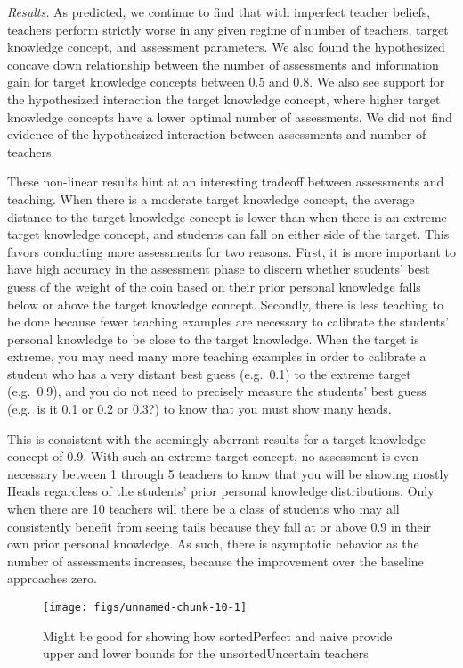 \documentclass[10pt, letterpaper]{article}
\newenvironment{CodeChunk}{}{}
\begin{document}
\emph{Results. } As predicted, we continue to find that with imperfect
teacher beliefs, teachers perform strictly worse in any given regime of
number of teachers, target knowledge concept, and assessment parameters.
We also found the hypothesized concave down relationship between the
number of assessments and information gain for target knowledge concepts
between 0.5 and 0.8. We also see support for the hypothesized
interaction the target knowledge concept, where higher target knowledge
concepts have a lower optimal number of assessments. We did not find
evidence of the hypothesized interaction between assessments and number
of teachers.

These non-linear results hint at an interesting tradeoff between
assessments and teaching. When there is a moderate target knowledge
concept, the average distance to the target knowledge concept is lower
than when there is an extreme target knowledge concept, and students can
fall on either side of the target. This favors conducting more
assessments for two reasons. First, it is more important to have high
accuracy in the assessment phase to discern whether students' best guess
of the weight of the coin based on their prior personal knowledge falls
below or above the target knowledge concept. Secondly, there is less
teaching to be done because fewer teaching examples are necessary to
calibrate the students' personal knowledge to be close to the target
knowledge. When the target is extreme, you may need many more teaching
examples in order to calibrate a student who has a very distant best
guess (e.g.~0.1) to the extreme target (e.g.~0.9), and you do not need
to precisely measure the students' best guess (e.g.~is it 0.1 or 0.2 or
0.3?) to know that you must show many heads.

This is consistent with the seemingly aberrant results for a target
knowledge concept of 0.9. With such an extreme target concept, no
assessment is even necessary between 1 through 5 teachers to know that
you will be showing mostly Heads regardless of the students' prior
personal knowledge distributions. Only when there are 10 teachers will
there be a class of students who may all consistently benefit from
seeing tails because they fall at or above 0.9 in their own prior
personal knowledge. As such, there is asymptotic behavior as the number
of assessments increases, because the improvement over the baseline
approaches zero.

\begin{CodeChunk}
\begin{figure}[t]
\texttt{[image: figs/unnamed-chunk-10-1]} \caption[Might be good for showing how sortedPerfect and naive provide upper and lower bounds for the unsortedUncertain teachers]{Might be good for showing how sortedPerfect and naive provide upper and lower bounds for the unsortedUncertain teachers}\label{fig:unnamed-chunk-10}
\end{figure}
\end{CodeChunk}
\end{document}
